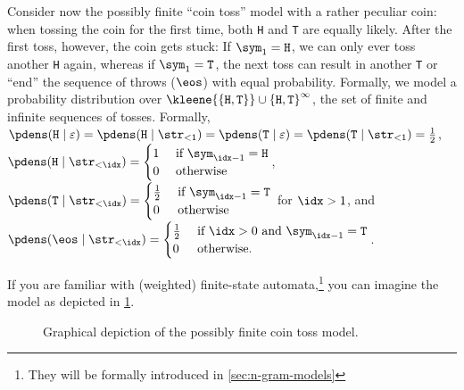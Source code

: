 \begin{example}\label{ex:possibly-inf-coin-toss}
Consider now the possibly finite ``coin toss'' model with a rather peculiar coin: when tossing the coin for the first time, both \texttt{H} and \texttt{T} are equally likely.
After the first toss, however, the coin gets stuck: If $\sym_1 = \texttt{H}$, we can only ever toss another \texttt{H} again, whereas if $\sym_1 = \texttt{T}$, the next toss can result in another \texttt{T} or ``end'' the sequence of throws ($\eos$) with equal probability. 
Formally, we model a probability distribution over $\kleene{\left\{\texttt{H}, \texttt{T}\right\}} \cup \left\{\texttt{H}, \texttt{T}\right\}^\infty$, the set of finite and infinite sequences of tosses. 
Formally, 
$\pdens(\texttt{H} \mid \varepsilon) = \pdens(\texttt{H} \mid \str_{<1}) = \pdens(\texttt{T} \mid \varepsilon) = \pdens(\texttt{T} \mid \str_{<1}) = \frac{1}{2}$, 
$\pdens(\texttt{H} \mid \str_{<\idx}) = 
\begin{cases}
    1 & \text{ if } \sym_{\idx - 1} = \texttt{H} \\ 
    0 & \text{ otherwise}
\end{cases}$, 
$\pdens(\texttt{T} \mid \str_{<\idx}) = 
\begin{cases}
    \frac{1}{2} & \text{ if } \sym_{\idx - 1} = \texttt{T} \\ 
    0 & \text{ otherwise}
\end{cases}$ 
for $\idx > 1$, and $\pdens(\eos \mid \str_{<\idx})= \begin{cases}
    \frac{1}{2} & \text{ if } \idx > 0 \text{ and } \sym_{\idx - 1} = \texttt{T} \\
    0 & \text{ otherwise.}
\end{cases}$.

If you are familiar with (weighted) finite-state automata,\footnote{They will be formally introduced in \cref{sec:n-gram-models}} you can imagine the model as depicted in \cref{fig:possibly-finite-coin-toss}.
\begin{figure}[ht]
    \centering
    \footnotesize
    \caption{Graphical depiction of the possibly finite coin toss model.}
    \label{fig:possibly-finite-coin-toss}
\end{figure}


\end{example}
